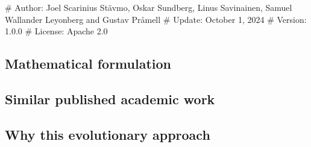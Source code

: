# Author: Joel Scarinius Stävmo, Oskar Sundberg, Linus Savinainen, Samuel Wallander Leyonberg  and Gustav Pråmell
# Update: October 1, 2024
# Version: 1.0.0
# License: Apache 2.0

\subsection{Mathematical formulation}
\subsection{Similar published academic work}
\subsection{Why this evolutionary approach}
